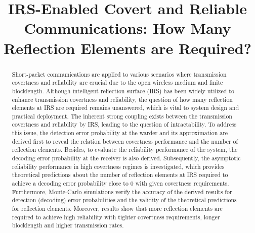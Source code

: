 \documentclass[conference]{IEEEtran}
\begin{document}
\title{IRS-Enabled Covert and Reliable Communications: How Many Reflection Elements are Required?}

\author{
}

\maketitle

\begin{abstract}
Short-packet communications are applied to various scenarios where transmission  covertness and reliability are crucial due to the open wireless medium and finite blocklength. Although intelligent reflection surface (IRS) has been widely utilized to enhance transmission covertness and reliability, the question of how many reflection elements at IRS are required remains unanswered, which is vital to system design and practical deployment. The inherent strong coupling exists between the transmission covertness and reliability by IRS, leading to the question of intractability. To address this issue, the detection error probability at the warder and its approximation are derived first to reveal the relation between covertness performance and the number of reflection elements. Besides, to evaluate the reliability performance of the system, the decoding error probability at the receiver is also derived. Subsequently, the asymptotic reliability performance in high covertness regimes is investigated, which provides theoretical predictions about the number of reflection elements at IRS required to achieve a decoding error probability close to 0 with given covertness requirements. Furthermore, Monte-Carlo simulations verify the accuracy of the derived results for detection (decoding) error probabilities and the validity of the theoretical predictions for reflection elements. Moreover, results show that more reflection elements are required to achieve high reliability with tighter covertness requirements, longer blocklength and higher transmission rates.
\end{abstract}
\end{document}
